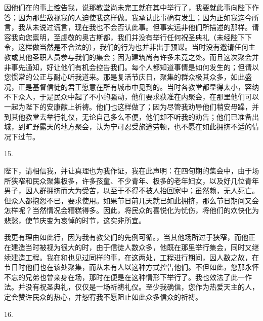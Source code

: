 因他们在的事上控告我，说那教堂尚未完工就在其中举行了，我要就此事向陛下作答；因为那些敌视我的人迫使我这样做。我承认此事确有发生；因为正如我迄今所言，我从未说过谎言，现在我也不会否认此事。但事实远非他们所描述的那样。请容我向您禀明，至虔敬的奥古斯都，我们并没有举行任何祝圣典礼（未经陛下下令，这样做当然是不合法的），我们的行为也并非出于预谋。当时没有邀请任何主教或其他圣职人员参与我们的集会；因为建筑尚有许多未竟之处。而且这次聚会并非事先通知，好让他们有机会控告我们。每个人都知道事情是如何发生的；但请以您惯常的公正与耐心听我道来。那是复活节庆日，聚集的群众极其众多，如此盛况，正是基督信徒的君王愿意在所有城市中见到的。当时各教堂都显得太小，容纳不下众人，于是民众中起了不小的骚动，他们要求获准在内聚会，在那里他们可以一起为陛下的安康献上祈祷。他们也这样做了；因为尽管我劝导他们稍安毋躁，并到其他教堂去举行礼仪，无论自己多么不便，他们却不听我的劝告；他们已准备出城，到旷野露天的地方聚会，认为宁可忍受旅途劳顿，也不愿在如此拥挤不适的情况下过节。\par

15. \par

陛下，请相信我，并让真理也为我作证，我在此声明：在四旬期的集会中，由于场所狭窄和民众聚集极多，许多孩童、不少青年、极多的老年妇女，以及好几位青年男子，因人群拥挤而大为受苦，以至于不得不被人抬回家中；虽然赖，无人死亡。但众人都抱怨不已，要求使用。如果节日前几天就已如此拥挤，那么节日期间又会怎样呢？当然情况会糟糕得多。因此，将民众的喜悦化为忧伤，将他们的欢快化为悲愁，使节庆变为哀悼的时节，这实非所宜。\par

我更有理由如此行，因为我有教父们的先例可循。，当其他场所过于狭窄，而他正在建造当时被视为很大的时，由于信徒人数众多，他既在那里举行集会，同时又继续建造工程。我在和也见过同样的事，在这两处，工程进行期间，因人数之故，在节日时他们也在该处聚集，而从未有人以这种方式控告他们。不但如此，您那永怀不忘的兄弟也曾亲身在场，那时在便是在这种情形下举行了。我也效法了此一作法。并没有祝圣典礼，仅仅是一场祈祷礼仪。至少我确信，您作为热爱天主的人，定会赞许民众的热心，并恕宥我不愿阻止如此众多信众的祈祷。\par

16. \par

